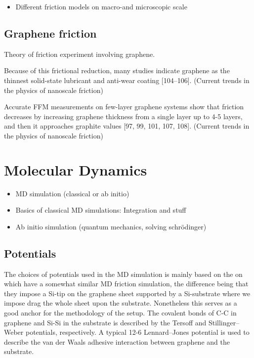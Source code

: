 \begin{itemize}
  \item Different friction models on macro-and microscopic scale
\end{itemize}


\subsection{Graphene friction}
Theory of friction experiment involving graphene.


Because of this frictional reduction, many studies indicate graphene as the thinnest solid-state lubricant and anti-wear coating [104–106].
(Current trends in the physics of nanoscale friction)


Accurate FFM measurements on few-layer graphene systems show that friction decreases by increasing graphene thickness from a single layer up
to 4-5 layers, and then it approaches graphite values [97, 99, 101, 107, 108]. (Current trends in the physics of nanoscale friction)




\section{Molecular Dynamics}


\begin{itemize}
  \item MD simulation (classical or ab initio)
  \item Basics of classical MD simulations: Integration and stuff
  \item Ab initio simulation (quantum mechanics, solving schrödinger)
\end{itemize}





\subsection{Potentials}

The choices of potentials used in the MD simulation is mainly based on the on \cite{li_evolving_2016} which have a somewhat similar MD friction simulation, the difference being that they impose a Si-tip on the graphene sheet supported by a Si-substrate where we impose drag the whole sheet upon the substrate. Nonetheless this serves as a good anchor for the methodology of the setup. The covalent bonds of C-C in graphene and Si-Si in the substrate is described by the Tersoff and Stillinger–Weber potentials, respectively. A typical 12-6 Lennard–Jones potential is used to describe the van der Waals adhesive interaction between graphene and the substrate. \\


